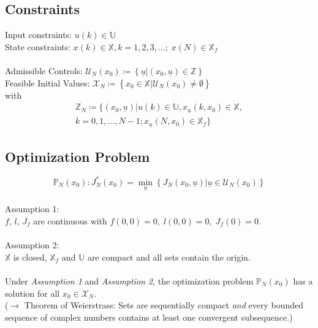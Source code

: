 \documentclass[english]{latex4ei/latex4ei_sheet}
\begin{document}
\begin{sectionbox}

\subsection{Constraints}
Input constraints: $u(k) \in \mathbb{U}$ \\ 
State constraints: $x(k) \in \mathbb{X}, k=1,2,3, \ldots ;\; x(N) \in \mathbb{X}_{f}$ \\ \\
Admissible Controls:  $\mathcal{U}_{N}\left(x_{0}\right)\coloneqq\left\{\underline{u} |\left(x_{0}, \underline{u}\right) \in \mathbb{Z}\right\}$ \\ Feasible Initial Values: $\mathcal{X}_{N}\coloneqq\left\{x_{0} \in \mathbb{X} | \mathcal{U}_{N}\left(x_{0}\right) \neq \emptyset\right\}$\\
with 
\begin{multline*}
\mathbb{Z}_{N}\coloneqq\Big\{\left(x_{0}, \underline{u}\right) | u(k) \in \mathbb{U}, x_{\underline{u}}\left(k, x_{0}\right) \in \mathbb{X}, \\ k=0,1, \ldots, N-1 ; x_{\underline{u}}\left(N, x_{0}\right) \in \mathbb{X}_{f}\Big\}
\end{multline*}

\subsection{Optimization Problem}
$$
\mathbb{P}_{N}\left(x_{0}\right): J_{N}^{*}\left(x_{0}\right)=\min _{\underline{u}}\left\{J_{N}\left(x_{0}, \underline{u}\right) | \underline{u} \in \mathcal{U}_{N}\left(x_{0}\right)\right\}
$$
\\
Assumption 1:\\
$f,\,l,\,J_f$ are continuous with $f(0,0)=0,\; l(0,0)=0,\; J_f(0)=0$.\\
\\
Assumption 2:\\
$\mathbb{X}$ is closed, $\mathbb{X}_f$ and $\mathbb{U}$ are compact and all sets contain the origin.\\
\\
Under \textit{Assumption 1} and \textit{Assumption 2}, the optimization problem $\mathbb{P}_N(x_0)$ has a solution for all $x_0\in\mathcal{X}_N$. \\($\rightarrow$ Theorem of Weierstrass: Sets are sequentially compact \textit{and} every bounded sequence of complex numbers contains at least one convergent subsequence.)


\end{sectionbox}
\end{document}
